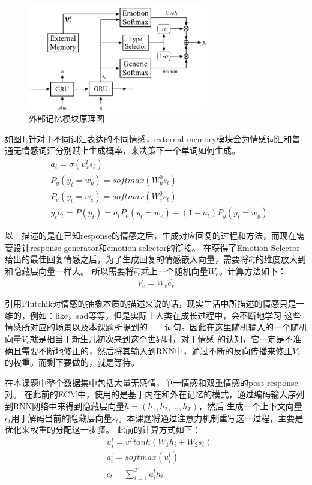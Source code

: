 \documentclass[supercite]{HustGraduPaper}
\theoremstyle{definition}
\begin{document}
\begin{figure}[H] %
  \centering %
  \includegraphics[width=0.7\textwidth]{images/ememory.png} %
  \caption{外部记忆模块原理图} %
  \label{Fig.ememory} %
\end{figure}

如图\ref{Fig.ememory},针对于不同词汇表达的不同情感，external memory模块会为情感词汇和普通无情感词汇分别赋上生成概率，来决策下一个单词如何生成。
\begin{align}
  &a_t = \sigma(v_u^T s_t)\\
  &P_g(y_t = w_g) = softmax(W_g^0 s_t)\\
  &P_e(y_t = w_e) = softmax(W_e^0 s_t)\\
  &y_t o_t = P(y_t) = a_t P_e(y_t=w_e) + (1-a_t)P_y(y_t=w_g)
\end{align}

以上描述的是在已知response的情感之后，生成对应回复的过程和方法，而现在需要设计response generator和emotion selector的衔接。
在获得了Emotion Selector给出的最佳回复情感之后，为了生成回复的情感嵌入向量，需要将$\hat{e_r}$的维度放大到和隐藏层向量一样大。
所以需要将$\hat{e_r}$乘上一个随机向量$W_e$。计算方法如下：
\begin{align}
  V_e = W_e \hat{e_r} \label{3.16} 
\end{align}

引用Plutchik\cite{plutchik1980general}对情感的抽象本质的描述来说的话，现实生活中所描述的情感只是一维的，例如：like，sad等等，但是实际上人类在成长过程中，会不断地学习
这些情感所对应的场景以及本课题所提到的——词句。因此在这里随机输入的一个随机向量$V_e$就是相当于新生儿初次来到这个世界时，对于情感
的认知，它一定是不准确且需要不断地修正的，然后将其输入到RNN中，通过不断的反向传播来修正$V_e$的权重。而剩下要做的，就是等待。

在本课题中整个数据集中包括大量无感情，单一情感和双重情感的post-response对。
在此前的ECM中，使用的是基于内在和外在记忆的模式，通过编码输入序列到RNN网络中来得到隐藏层向量$h = (h_1,h_2,...,h_T)$，然后
生成一个上下文向量$c_t$用于解码当前的隐藏层向量$s_t$。本课题将通过注意力机制重写这一过程，主要是优化来权重的分配这一步骤。
此前的计算方式如下：
\begin{align}
  &u_i^t = v^T tanh(W_1h_i + W_2 s_t) \label{3.17}\\
  &a_i^t = softmax(u_i^t) \label{3.18}\\
  &c_t = \sum_{i=1}^T a_i^t h_i \label{3.19}
\end{align}
\end{document}

